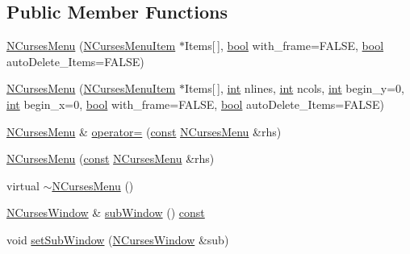 \subsection*{Public Member Functions}
\begin{DoxyCompactItemize}
\item 
\hyperlink{class_n_curses_menu_a720ea1c6b566f3c454cddda8103dba74}{N\-Curses\-Menu} (\hyperlink{class_n_curses_menu_item}{N\-Curses\-Menu\-Item} $\ast$Items\mbox{[}$\,$\mbox{]}, \hyperlink{term__entry_8h_a002004ba5d663f149f6c38064926abac}{bool} with\-\_\-frame=F\-A\-L\-S\-E, \hyperlink{term__entry_8h_a002004ba5d663f149f6c38064926abac}{bool} auto\-Delete\-\_\-\-Items=F\-A\-L\-S\-E)
\item 
\hyperlink{class_n_curses_menu_ac507fb53a572ca93cfb61320d92958fc}{N\-Curses\-Menu} (\hyperlink{class_n_curses_menu_item}{N\-Curses\-Menu\-Item} $\ast$Items\mbox{[}$\,$\mbox{]}, \hyperlink{term__entry_8h_ad65b480f8c8270356b45a9890f6499ae}{int} nlines, \hyperlink{term__entry_8h_ad65b480f8c8270356b45a9890f6499ae}{int} ncols, \hyperlink{term__entry_8h_ad65b480f8c8270356b45a9890f6499ae}{int} begin\-\_\-y=0, \hyperlink{term__entry_8h_ad65b480f8c8270356b45a9890f6499ae}{int} begin\-\_\-x=0, \hyperlink{term__entry_8h_a002004ba5d663f149f6c38064926abac}{bool} with\-\_\-frame=F\-A\-L\-S\-E, \hyperlink{term__entry_8h_a002004ba5d663f149f6c38064926abac}{bool} auto\-Delete\-\_\-\-Items=F\-A\-L\-S\-E)
\item 
\hyperlink{class_n_curses_menu}{N\-Curses\-Menu} \& \hyperlink{class_n_curses_menu_afd2028d59de15056eb5ba24b7344aef6}{operator=} (\hyperlink{term__entry_8h_a57bd63ce7f9a353488880e3de6692d5a}{const} \hyperlink{class_n_curses_menu}{N\-Curses\-Menu} \&rhs)
\item 
\hyperlink{class_n_curses_menu_aa8ed719d36181fb0af7a0e4582a68b80}{N\-Curses\-Menu} (\hyperlink{term__entry_8h_a57bd63ce7f9a353488880e3de6692d5a}{const} \hyperlink{class_n_curses_menu}{N\-Curses\-Menu} \&rhs)
\item 
virtual \hyperlink{class_n_curses_menu_abb29f527e08dab5ec871ea8af6d3e660}{$\sim$\-N\-Curses\-Menu} ()
\item 
\hyperlink{class_n_curses_window}{N\-Curses\-Window} \& \hyperlink{class_n_curses_menu_aded6a5b30097c14351b4edffea57dcd8}{sub\-Window} () \hyperlink{term__entry_8h_a57bd63ce7f9a353488880e3de6692d5a}{const} 
\item 
void \hyperlink{class_n_curses_menu_a864744992ccd07b01bad0ef21d79e27a}{set\-Sub\-Window} (\hyperlink{class_n_curses_window}{N\-Curses\-Window} \&sub)
\item 

\end{DoxyCompactItemize}
